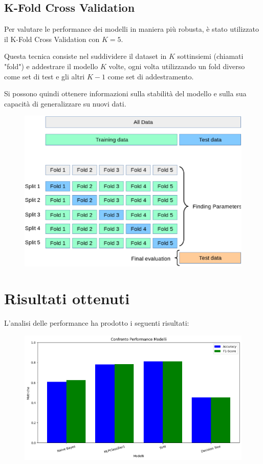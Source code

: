 \documentclass{article}
\begin{document}
\subsection{K-Fold Cross Validation}

Per valutare le performance dei modelli in maniera più robusta, è stato utilizzato il 
K-Fold Cross Validation con $K=5$. 

Questa tecnica consiste nel suddividere il dataset in 
$K$ sottinsiemi (chiamati "fold") e addestrare il modello $K$ volte, ogni volta 
utilizzando un fold diverso come set di test e gli altri $K-1$ come set di addestramento. 

Si possono quindi ottenere informazioni sulla stabilità del modello e sulla sua capacità di generalizzare su nuovi dati.

\begin{figure}[H]
    \centering
    \includegraphics[scale=0.8]{Figures/KfoldCrossValidation.jpeg}
    \label{fig:KfoldCrossValidation}
\end{figure}

\clearpage
\section{Risultati ottenuti}

L'analisi delle performance ha prodotto i seguenti risultati: 

\begin{figure}[H]
    \centering
    \includegraphics[scale=0.5]{Figures/output9.png}
\end{figure}
\end{document}
